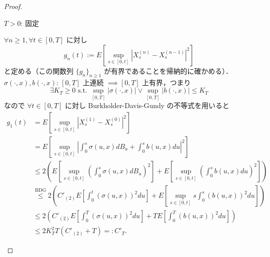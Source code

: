 \documentclass{jsarticle}
\begin{document}
\begin{proof}
\begin{enumerate}[label=(\roman*)]
        $T>0$: 固定

        $\forall n\ge1, \forall t\in[0, T]$ に対し
        $$
        g_n(t)
        := E[\sup_{s\in[0, t]}\left\lvert X_s^{(n)}-X_s^{(n-1)}\right\rvert^2]
        $$
        と定める（この関数列 $\{g_n\}_{n\ge1}$ が有界であることを帰納的に確かめる）．
        $\sigma(\cdot, x), b(\cdot, x)$: $[0, T]$ 上連続 $\implies [0, T]$ 上有界，つまり
        $$
        \exists K_T\ge0\text{ s.t. }\sup_{[0, T]}\left\lvert \sigma(\cdot, x)\right\rvert\vee\sup_{[0, T]}\left\lvert b(\cdot, x)\right\rvert\le K_T
        $$
        なので $\forall t\in[0, T]$ に対し Burkholder-Davis-Gundy の不等式を用いると
        \begin{align}
            g_1(t)
            &= E[\sup_{s\in[0, t]}\left\lvert X_s^{(1)}-X_s^{(0)}\right\rvert^2] \\
            &= E[\sup_{s\in[0, t]}\left\lvert \int_0^s \sigma(u, x)dB_u
            + \int_0^s b(u, x)du\right\rvert^2] \\
            &\le 2(E[\sup_{s\in[0, t]}(\int_0^s \sigma(u, x)dB_u)^2]
            + E[\sup_{s\in[0, t]}(\int_0^s b(u, x)du)^2]) \\
            &\stackrel{\text{BDG}}{\le}
            2(C'_{(2)}E[\int_0^t (\sigma(u, x))^2 du]
            + E[\sup_{s\in[0, t]}s\int_0^s (b(u, x))^2du]) \\
            &\le 2(C'_{(2)}E[\int_0^T (\sigma(u, x))^2du]
            + TE[\int_0^T (b(u, x))^2du]) \\
            &\le 2K_T^2T(C'_{(2)}+T)=:C'_T.
        \end{align}


\end{enumerate}
\end{proof}
\end{document}
